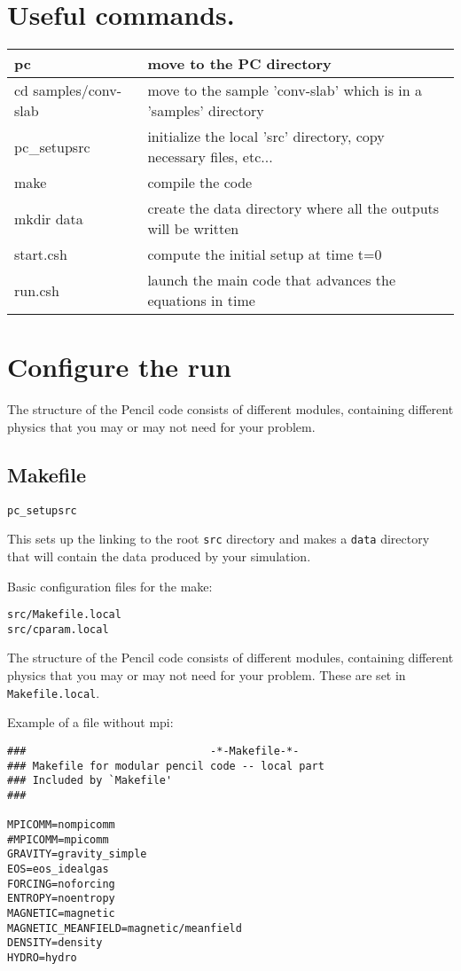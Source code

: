 \documentclass[a4paper,12pt]{article}
\begin{document}
\section{Useful commands.}
\begin{center}
\begin{tabular}{|l|l|}\hline
pc & move to the PC directory\\\hline
cd samples/conv-slab & move to the sample 'conv-slab' which is in a 'samples'
directory\\\hline
pc\_setupsrc & initialize the local 'src' directory, copy necessary files,
etc...\\\hline
make & 	compile the code\\\hline
mkdir data & create the data directory where all the outputs will be written
\\\hline
start.csh & compute the initial setup at time t=0 \\\hline
run.csh & launch the main code that advances the equations in time\\\hline
\end{tabular}
\end{center}

\section{Configure the run}
The structure of the Pencil code consists of different modules, containing
different physics that you may or may not need for your problem. 

\subsection{Makefile}

\begin{verbatim}
pc_setupsrc
\end{verbatim}
This sets up the linking to the root \verb|src| directory and makes a
\verb|data| directory that will contain the data produced by your simulation.

Basic configuration files for the make:
\begin{verbatim}
src/Makefile.local
src/cparam.local
\end{verbatim}

The structure of the Pencil code consists of different modules, containing
different physics that you may or may not need for your problem. These are set
in \verb|Makefile.local|. 

Example of a file without mpi:
\begin{verbatim}
###                             -*-Makefile-*-
### Makefile for modular pencil code -- local part
### Included by `Makefile'
###

MPICOMM=nompicomm
#MPICOMM=mpicomm
GRAVITY=gravity_simple
EOS=eos_idealgas
FORCING=noforcing
ENTROPY=noentropy
MAGNETIC=magnetic
MAGNETIC_MEANFIELD=magnetic/meanfield
DENSITY=density
HYDRO=hydro
\end{verbatim}
\end{document}
